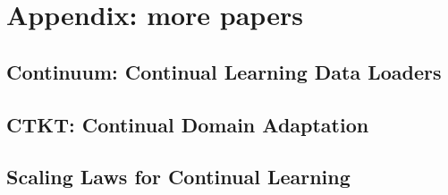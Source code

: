 \chapter{Appendix: more papers}
\label{chapter:appendix}

{}


\section{Continuum: Continual Learning Data Loaders}

\section{CTKT: Continual Domain Adaptation}

\section{Scaling Laws for Continual Learning}


